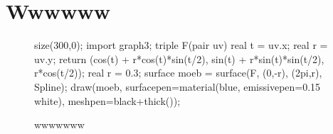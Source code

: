 \section{Wwwwww}

\begin{figure}
	\begin{asy}
size(300,0);
import graph3;
triple F(pair uv) {
real t = uv.x;
real r = uv.y;
return (cos(t) + r*cos(t)*sin(t/2),
sin(t) + r*sin(t)*sin(t/2),
r*cos(t/2));
}
real r = 0.3;
surface moeb = surface(F, (0,-r), (2pi,r), Spline);
draw(moeb, surfacepen=material(blue, emissivepen=0.15 white), meshpen=black+thick());
	\end{asy}
\caption{wwwwwww}
\end{figure}
